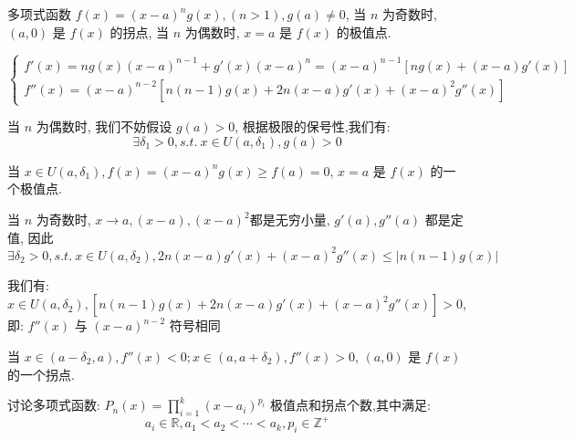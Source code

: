 \begin{proposition}\label{pro: 命题二}
	多项式函数 $f(x) = (x-a)^{n}g(x), (n>1), g(a)\neq 0$, 当 $n$ 为奇数时, $(a,0)$ 是 $f(x)$ 的拐点, 当 $n$ 为偶数时, $x=a$ 是 $f(x)$ 的极值点.
\end{proposition}
\begin{anymark}[证明]

	$$\begin{cases}
		f'(x) = ng(x)(x-a)^{n-1} + g'(x)(x-a)^{n} = (x-a)^{n-1}[ng(x)+(x-a)g'(x)]\\
		f''(x) = (x-a)^{n-2}[n(n-1)g(x) +2n(x-a)g'(x)+(x-a)^{2}g''(x)]
	\end{cases}$$

	当 $n$ 为偶数时, 我们不妨假设 $g(a) > 0$, 根据极限的保号性,我们有:
	$$\exists \delta_{1} > 0, s.t.\ x\in U(a,\delta_{1}), g(a) > 0$$
	
	当 $x\in U(a,\delta_{1}), f(x) = (x-a)^{n}g(x) \geq f(a) =0$, $x=a$ 是 $f(x)$ 的一个极值点. 


	当 $n$ 为奇数时, $x\to a,(x-a),(x-a)^{2}$都是无穷小量, $g'(a),g''(a)$ 都是定值, 因此
	$$\exists \delta_{2} > 0, s.t.\ x\in U(a,\delta_{2}), 2n(x-a)g'(x)+(x-a)^{2}g''(x)\leq |n(n-1)g(x)| $$

	我们有: $x\in U(a,\delta_{2}), [n(n-1)g(x) +2n(x-a)g'(x)+(x-a)^{2}g''(x)] > 0$, 即: $f''(x)$ 与 $(x-a)^{n-2}$ 符号相同

	当 $x\in (a-\delta_{2},a), f''(x) < 0; x\in (a,a+\delta_{2}), f''(x) > 0$, $(a,0)$ 是 $f(x)$ 的一个拐点.
\end{anymark}

\begin{proposition}\label{pro: 命题三}
	讨论多项式函数: $P_{n}(x) = \prod\limits_{i=1}^{k}(x-a_{i})^{p_{i}}$ 极值点和拐点个数,其中满足:
	$$a_{i}\in\mathbb{R}, a_{1}<a_{2}<\cdots<a_{k}, p_{i}\in \mathbb{Z}^{+}$$
\end{proposition}

